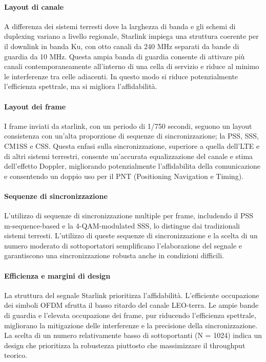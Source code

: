 \paragraph{Layout di canale} A differenza dei sistemi terresti dove la larghezza di banda e gli schemi di duplexing variano a livello regionale, Starlink impiega una struttura coerente per il downlink in banda Ku, con otto canali da 240 MHz separati da bande di guardia da 10 MHz.
Questa ampia banda di guardia consente di attivare più canali contemporaneamente all'interno di una cella di servizio e riduce al minimo le interferenze tra celle adiacenti.
In questo modo si riduce potenzialmente l'efficienza spettrale, ma si migliora l'affidabilità.

\paragraph{Layout dei frame}
I frame inviati da starlink, con un periodo di 1/750 secondi, seguono un layout consistenza con un'alta proporzione di sequenze di sincronizzazione; la PSS, SSS, CM1SS e CSS.
Questa enfasi sulla sincronizzazione, superiore a quella dell'LTE e di altri sistemi terrestri, consente un'accurata equalizzazione del canale e stima dell'effetto Doppler, migliorando potenzialmente l'affidabilita della comunicazione e consentendo un doppio uso per il PNT (Positioning Navigation e Timing).

\paragraph{Sequenze di sincronizzazione}
L'utilizzo di sequenze di sincronizzazione multiple per frame, includendo il PSS m-sequence-based e la 4-\ac{QAM}-modulated SSS, lo distingue dai tradizionali sistemi terresti.
L'utilizzo di queste sequenze di sincronizzazione e la scelta di un numero moderato di sottoportatori semplificano l'elaborazione del segnale e garantiscono una sincronizzazione robusta anche in condizioni difficili.

\paragraph{Efficienza e margini di design}
La struttura del segnale Starlink prioritizza l'affidabilità.
L'efficiente occupazione dei simboli OFDM sfrutta il basso ritardo del canale \ac{LEO}-terra.
Le ampie bande di guardia e l'elevata occupazione dei frame, pur riducendo l'efficienza spettrale, migliorano la mitigazione delle interferenze e la precisione della sincronizzazione.
La scelta di un numero relativamente basso di sottoportanti (N = 1024) indica un design che prioritizza la robustezza piuttosto che massimizzare il throughput teorico.
